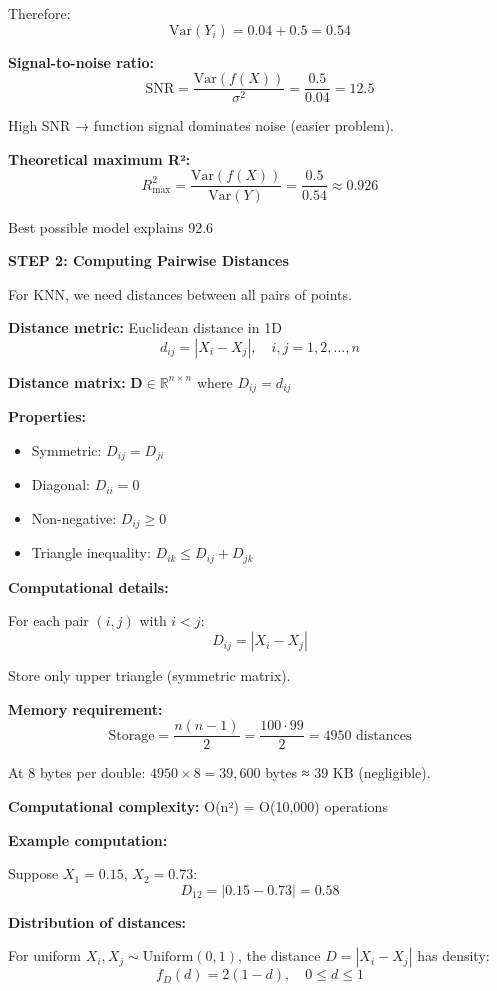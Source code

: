 \documentclass[12pt]{article}
\begin{document}
\begin{solution}
Therefore:
\[
\text{Var}(Y_i) = 0.04 + 0.5 = 0.54
\]

\textbf{Signal-to-noise ratio:}
\[
\text{SNR} = \frac{\text{Var}(f(X))}{\sigma^2} = \frac{0.5}{0.04} = 12.5
\]

High SNR → function signal dominates noise (easier problem).

\textbf{Theoretical maximum R²:}
\[
R^2_{\max} = \frac{\text{Var}(f(X))}{\text{Var}(Y)} = \frac{0.5}{0.54} \approx 0.926
\]

Best possible model explains 92.6%

\textbf{STEP 2: Computing Pairwise Distances}

For KNN, we need distances between all pairs of points.

\textbf{Distance metric:} Euclidean distance in 1D
\[
d_{ij} = |X_i - X_j|, \quad i, j = 1, 2, \ldots, n
\]

\textbf{Distance matrix:} $\mathbf{D} \in \mathbb{R}^{n \times n}$ where $D_{ij} = d_{ij}$

\textbf{Properties:}
\begin{itemize}
    \item Symmetric: $D_{ij} = D_{ji}$
    \item Diagonal: $D_{ii} = 0$
    \item Non-negative: $D_{ij} \geq 0$
    \item Triangle inequality: $D_{ik} \leq D_{ij} + D_{jk}$
\end{itemize}

\textbf{Computational details:}

For each pair $(i, j)$ with $i < j$:
\[
D_{ij} = |X_i - X_j|
\]

Store only upper triangle (symmetric matrix).

\textbf{Memory requirement:}
\[
\text{Storage} = \frac{n(n-1)}{2} = \frac{100 \cdot 99}{2} = 4950 \text{ distances}
\]

At 8 bytes per double: $4950 \times 8 = 39,600$ bytes ≈ 39 KB (negligible).

\textbf{Computational complexity:} O(n²) = O(10,000) operations

\textbf{Example computation:}

Suppose $X_1 = 0.15$, $X_2 = 0.73$:
\[
D_{12} = |0.15 - 0.73| = 0.58
\]

\textbf{Distribution of distances:}

For uniform $X_i, X_j \sim \text{Uniform}(0,1)$, the distance $D = |X_i - X_j|$ has density:
\[
f_D(d) = 2(1-d), \quad 0 \leq d \leq 1
\]


\end{solution}
\end{document}
